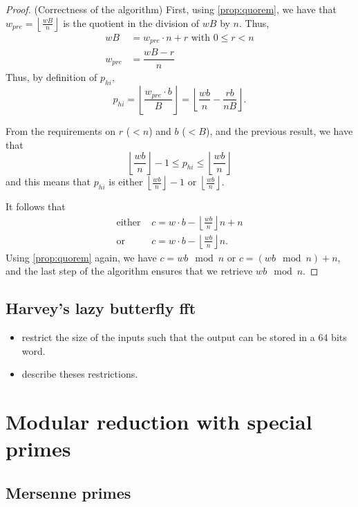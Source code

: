 \documentclass[a4paper]{article}
\begin{document}
\begin{proof} (Correctness of the algorithm)
First, using \autoref{prop:quorem}, we have that $w_{pre}= \left\lfloor\frac{wB}{n}\right\rfloor $ is the quotient in the division of $wB$ by $n$. Thus,
\begin{align*}
wB &= w_{pre}\cdot n + r \text{ with } 0 \leq r < n \\
w_{pre} &= \dfrac{wB - r}{n}
\end{align*}
Thus, by definition of $p_{hi}$,
\[
p_{hi} = \left\lfloor\frac{w_{pre}\cdot b}{B}\right\rfloor
= \left\lfloor\dfrac{wb}{n} - \dfrac{rb}{nB} \right\rfloor.
\]

From the requirements on $r$ ($<n$) and $b$ ($<B$), and the previous result, we have that
\[
\left\lfloor\dfrac{wb}{n}\right\rfloor - 1 \leq p_{hi} \leq \left\lfloor\dfrac{wb}{n}\right\rfloor
\]
and this means that $p_{hi}$ is either $\left\lfloor\frac{wb}{n}\right\rfloor - 1$ or $\left\lfloor\frac{wb}{n}\right\rfloor$.


It follows that 
\begin{align*}
\text{either } &c=w\cdot b - \left\lfloor\frac{wb}{n}\right\rfloor n + n \\
\text{or } &c=w\cdot b - \left\lfloor\frac{wb}{n}\right\rfloor n.
\end{align*}
Using \autoref{prop:quorem} again, we have $c=wb \mod n$ or $c=(wb \mod n)+n$, and the last step of the algorithm ensures that we retrieve $wb \mod n$.
\end{proof}

\subsection{Harvey's lazy butterfly fft}

\begin{itemize}
    \item restrict the size of the inputs such that the output can be stored in a 64 bits word.
    \item describe theses restrictions.
\end{itemize}


\section{Modular reduction with special primes}

\subsection{Mersenne primes}
\end{document}
